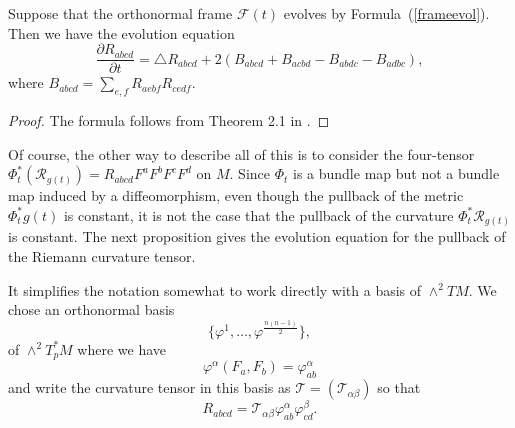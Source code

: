 \begin{lemma}\label{lem:curvature-evolution-frame}
\label{M}

Suppose that the orthonormal frame ${\mathcal F}(t)$  evolves by
Formula~(\ref{frameevol}). Then we have the evolution equation
$$\frac{\partial R_{abcd}}{\partial t} = \triangle R_{abcd} +
2(B_{abcd} +B_{acbd}-B_{abdc}-B_{adbc}),$$ where $B_{abcd} =
\sum_{e,f}R_{aebf}R_{cedf}$.
\end{lemma}


\begin{proof}
\sketch The formula follows from Theorem 2.1 in \cite{Hamiltonharnack}.
\end{proof}

Of course, the other way to describe all of this  is to consider the
four-tensor $\Phi_t^*({\mathcal R}_{g(t)})=R_{abcd}F^aF^bF^cF^d$ on
$M$. Since $\Phi_t$ is a bundle map but not a bundle map induced by
a diffeomorphism, even though the pullback of the metric
$\Phi_t^*g(t)$ is constant, it is not the case that the pullback of
the curvature $\Phi_t^*{\mathcal R}_{g(t)}$ is constant.
 The next proposition gives the evolution equation for the pullback
 of the Riemann curvature tensor.



It simplifies the notation somewhat to work directly with a basis of
$\wedge^2TM$. We chose an orthonormal basis
$$\{\varphi^{1},\ldots,\varphi^{\frac{n(n-1)}{2}}\},$$
of $\wedge^2T^*_pM$ where  we have \[ \varphi^{\alpha}(F_{a},F_{b})
= \varphi^{\alpha}_{ab} \] and write the curvature tensor in this
basis as ${\mathcal T} = ({\mathcal T}_{\alpha\beta})$ so that
\begin{equation}\label{Mdefn}
R_{abcd}={\mathcal
T}_{\alpha\beta}\varphi^{\alpha}_{ab}\varphi^{\beta}_{cd}.\end{equation}


